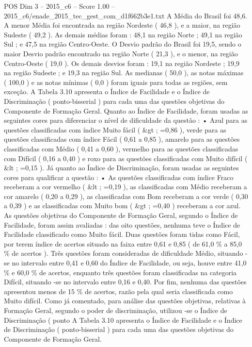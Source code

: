 \begin{textsample}{POS Dim 3 – 2015\_c6 – Score 1.00 – 2015\_c6/enade\_2015\_tec\_gest\_com\_d1f662b3e1.txt}
A Média do Brasil foi 48,6.
A menor Média foi encontrada na região Nordeste ( 46,8 ), e a maior, na região Sudeste ( 49,2 ).
As demais médias foram : 48,1 na região Norte ; 49,1 na região Sul ; e 47,5 na região Centro-Oeste.
O Desvio padrão do Brasil foi 19,5, sendo o maior Desvio padrão encontrado na região Norte ( 21,3 ), e o menor, na região Centro-Oeste ( 19,0 ).
Os demais desvios foram : 19,1 na região Nordeste ; 19,9 na região Sudeste ; e 19,3 na região Sul.
As medianas ( 50,0 ), as notas máximas ( 100,0 ) e as notas mínimas ( 0,0 ) foram iguais para todas as regiões, sem exceção.
A Tabela 3.10 apresenta o Índice de Facilidade e o Índice de Discriminação ( ponto-bisserial ) para cada uma das questões objetivas do Componente de Formação Geral.
Quanto ao Índice de Facilidade, foram usadas as seguintes cores para diferenciar o nível de dificuldade da questão : • Azul para as questões classificadas com índice Muito fácil ( \&gt ; =0,86 ), verde para as questões classificadas com índice Fácil ( 0,61 a 0,85 ), amarelo para as questões classificadas com Médio ( 0,41 a 0,60 ), vermelho para as questões classificadas com Difícil ( 0,16 a 0,40 ) e roxo para as questões classificadas com Muito difícil ( \&lt ; =0,15 ).
Já quanto ao Índice de Discriminação, foram usadas as seguintes cores para qualificar a questão : • As questões classificadas com índice Fraco receberam a cor vermelho ( \&lt ; =0,19 ), as classificadas com Médio receberam a cor amarelo ( 0,20 a 0,29 ), as classificadas com Bom receberam a cor verde ( 0,30 a 0,39 ) e as classificadas com Muito bom ( \&gt ; =0,40 ) receberam a cor azul.
As questões objetivas do Componente de Formação Geral, segundo o Índice de Facilidade, foram assim avaliadas : das oito questões, nenhuma teve o Índice de Facilidade classificado como Muito fácil.
Duas questões foram tidas como Fácil, por terem índice de acertos situado na faixa entre 0,61 e 0,85 ( de 61,0 \% a 85,0 \% de acertos ).
Três questões foram consideradas de dificuldade Médio, situando -se no intervalo entre 0,41 e 0,60 do Índice de Facilidade, ou seja, houve entre 41,0 \% e 60,0 \% de acertos, enquanto três questões foram classificadas na categoria Difícil, situando -se no intervalo entre 0,16 e 0,40.
Por fim, nenhuma das questões apresentou menos de 15 \% de acertos, razão pela qual seria classificada como Muito difícil.
Como já comentado, para análise das questões objetivas, relativas à Formação Geral, segundo o poder de discriminação, utilizou -se o Índice de Discriminação ( ponto A Tabela 3.10 apresenta o Índice de Facilidade e o Índice de Discriminação ( ponto-bisserial ) para cada uma das questões objetivas do Componente de Formação Geral.

\end{textsample}

